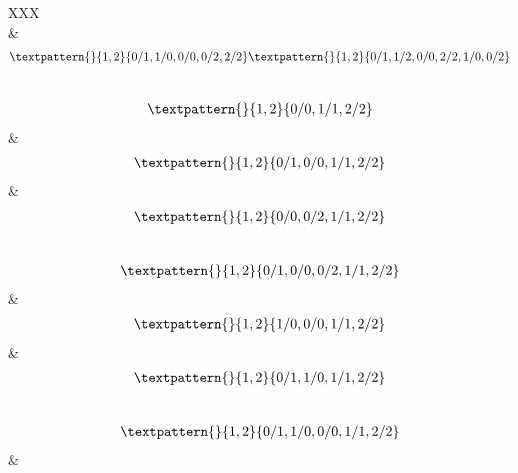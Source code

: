 \begin{center}
\begin{longtabu}[l]{XXX}
\begin{equation}
\end{equation}
    &
\begin{equation}
	\begin{gathered}
		\textpattern{}{1,2}{0/1,1/0,0/0,0/2,2/2}
		\textpattern{}{1,2}{0/1,1/2,0/0,2/2,1/0,0/2}
	\end{gathered}
	\label{cls:91}
\end{equation}
\\
\begin{equation}
	\begin{gathered}
		\textpattern{}{1,2}{0/0,1/1,2/2}
	\end{gathered}
	\label{cls:92}
\end{equation}
    &
\begin{equation}
	\begin{gathered}
		\textpattern{}{1,2}{0/1,0/0,1/1,2/2}
	\end{gathered}
	\label{cls:93}
\end{equation}
    &
\begin{equation}
	\begin{gathered}
		\textpattern{}{1,2}{0/0,0/2,1/1,2/2}
	\end{gathered}
	\label{cls:94}
\end{equation}
\\
\begin{equation}
	\begin{gathered}
		\textpattern{}{1,2}{0/1,0/0,0/2,1/1,2/2}
	\end{gathered}
	\label{cls:95}
\end{equation}
&
\begin{equation}
	\begin{gathered}
		\textpattern{}{1,2}{1/0,0/0,1/1,2/2}
	\end{gathered}
	\label{cls:96}
\end{equation}
&
\begin{equation}
	\begin{gathered}
		\textpattern{}{1,2}{0/1,1/0,1/1,2/2}
	\end{gathered}
	\label{cls:97}
\end{equation}
\\
\begin{equation}
	\begin{gathered}
		\textpattern{}{1,2}{0/1,1/0,0/0,1/1,2/2}
	\end{gathered}
	\label{cls:98}
\end{equation}
&
\begin{equation}
	\begin{gathered}

\end{gathered}
\end{equation}
\end{longtabu}
\end{center}
